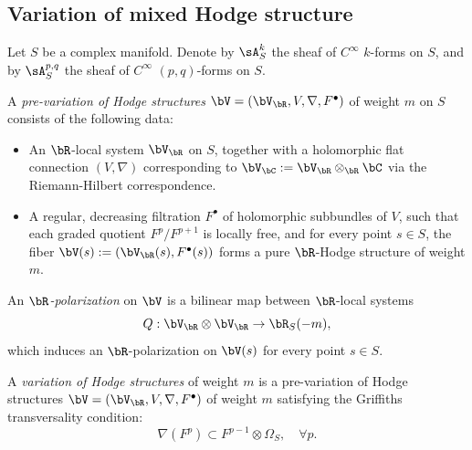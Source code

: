 \documentclass[11pt,letterpaper]{amsart}
\numberwithin{equation}{section}
\begin{document}
\subsection{Variation of mixed Hodge structure}
Let $S$ be a complex manifold. Denote by $\sA^k_S$ the sheaf of $C^\infty$ $k$-forms on $S$, and by $\sA^{p,q}_S$ the sheaf of $C^\infty$ $(p,q)$-forms on $S$.
\begin{defn}  
	A \emph{pre-variation of Hodge structures} $\bV = (\bV_{\bR}, V, \nabla, F^\bullet)$ of weight $m$ on $S$ consists of the following data:  
	\begin{itemize}  
		\item An $\bR$-local system $\bV_{\bR}$ on $S$, together with a holomorphic flat connection $(V, \nabla)$ corresponding to $\bV_{\bC} := \bV_{\bR} \otimes_{\bR} \bC$ via the Riemann-Hilbert correspondence.  
		\item A regular, decreasing filtration $F^\bullet$ of holomorphic subbundles of $V$, such that each graded quotient $F^p / F^{p+1}$ is locally free, and for every point $s \in S$, the fiber $\bV(s) := (\bV_{\bR}(s), F^\bullet(s))$ forms a pure $\bR$-Hodge structure of weight $m$.  
	\end{itemize}  		
	An \emph{$\bR$-polarization} on $\bV$ is a bilinear map between $\bR$-local systems  
	$$ Q : \bV_{\bR} \otimes \bV_{\bR} \to \bR_S(-m), $$  
	which induces an $\bR$-polarization on $\bV(s)$ for every point $s \in S$.  
	
	A \emph{variation of Hodge structures} of weight $m$ is a pre-variation of Hodge structures $\bV = (\bV_{\bR}, V, \nabla, F^\bullet)$ of weight $m$ satisfying the Griffiths transversality condition:  
	$$ \nabla(F^p) \subset F^{p-1} \otimes \Omega_S, \quad \forall p. $$  
\end{defn}
\end{document}
